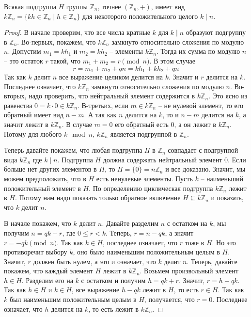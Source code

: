 \begin{claim}
\label{claim::Znsubgroups}
Всякая подгруппа $H$ группы $\mathbb Z_n$, точнее $(\mathbb Z_n, +)$, имеет вид $k\mathbb Z_n =\{kh\in \mathbb Z_n \mid h\in \mathbb Z_n\}$ для некоторого положительного целого $k \mid n$.
\end{claim}
\begin{proof}
В начале проверим, что все числа кратные $k$ для $k \mid n$ образуют подгруппу в $\mathbb Z_n$.
Во-первых, покажем, что $k\mathbb Z_n$ замкнуто относительно сложения по модулю $n$.
Допустим $m_1 = k h_1$ и $m_2 = k h_2$ -- элементы $k \mathbb Z_n$.
Тогда их сумма по модулю $n$ -- это остаток $r$ такой, что $ m_1+ m_2 = r \pmod{n}$.
В этом случае
\[
r = m_1 + m_2 + q n = k h_1 + kh_2 + qn
\]
Так как $k$ делит $n$ все выражение целиком делится на $k$.
Значит и $r$ делится на $k$.
Последнее означает, что $k \mathbb Z_n$ замкнуто относительно сложения по модулю $n$.
Во-вторых,  надо проверить, что нейтральный элемент содержится в $k\mathbb Z_n$.
Это ясно из равенства $0 = k \cdot 0\in k\mathbb Z_n$.
В-третьих, если $m\in k\mathbb Z_n$ -- не нулевой элемент, то его обратный имеет вид $n - m$.
А так как $n$ делится на $k$, то и $n - m$ делится на $k$, а значит лежит в $k\mathbb Z_n$.
В случае $m = 0$ его обратный есть $0$, а он лежит в $k \mathbb Z_n$.
Потому для любого $k\mod n$, $k\mathbb Z_n$ является подгруппой в $\mathbb Z_n$.

Теперь давайте покажем, что любая подгруппа $H$ в $\mathbb Z_n$ совпадает с подгруппой вида $k\mathbb Z_n$ где $k\mid n$.
Подгруппа $H$ должна содержать нейтральный элемент  $0$.
Если больше нет других элементов в $H$, то $H = \{0\} = n \mathbb Z_n$ и все доказано.
Значит, мы можем предположить, что в $H$ есть ненулевые элементы.
Пусть $k$ -- наименьший положительный элемент в $H$.
По определению циклическая подгруппа $k\mathbb Z_n$ лежит в $H$.
Потому нам надо показать только обратное включение $H\subseteq k \mathbb Z_n$ и показать, что $k$ делит $n$.

В начале покажем, что $k$ делит $n$.
Давайте разделим $n$ с остатком на $k$, мы получим $n = qk + r$, где $0\leqslant r < k$.
Теперь, $r = n - q k$, а значит $r = -q k \pmod{n}$.
Так как $k\in H$, последнее означает, что $r$ тоже в $H$.
Но это противоречит выбору $k$, оно было наименьшим положительным целым в $H$.
Значит, $r$ должен быть нулем, а это и означает, что $k$ делит $n$.
Теперь, давайте покажем, что каждый элемент $H$ лежит в $k\mathbb Z_n$.
Возьмем произвольный элемент $h\in H$.
Разделим его на $k$ с остатком и получим $h = q k + r$.
Значит, $r = h - q k$.
Так как $h\in H$ и $k\in H$, все выражение $h - qk$ лежит в $H$, то есть $r\in H$.
Так как $k$ был наименьшим положительным целым в $H$, получается, что $r = 0$.
Последнее означает, что $h$ делится на $k$, то есть лежит в $k\mathbb Z_n$.
\end{proof}


